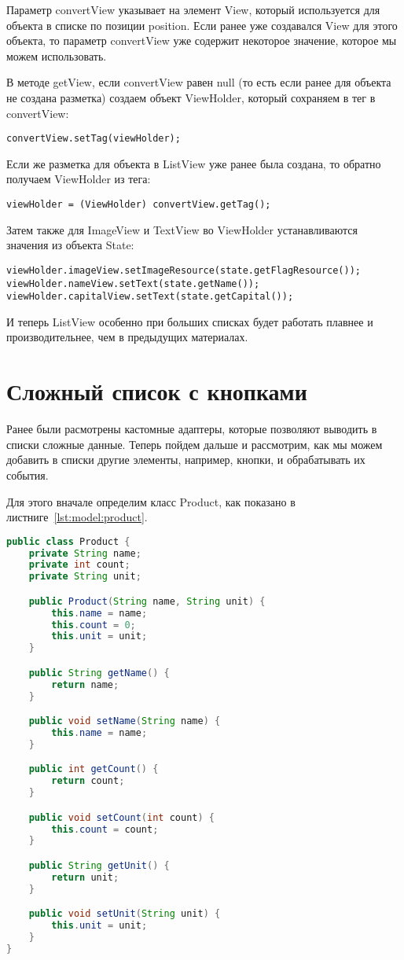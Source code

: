 Параметр convertView указывает на элемент View, который используется для
объекта в списке по позиции position. Если ранее уже создавался View для
этого объекта, то параметр convertView уже содержит некоторое значение,
которое мы можем использовать.\par
В методе getView, если convertView равен null (то есть если ранее для
объекта не создана разметка) создаем объект ViewHolder, который сохраняем
в тег в convertView:

\begin{verbatim}
convertView.setTag(viewHolder);
\end{verbatim}

Если же разметка для объекта в ListView уже ранее была создана, то обратно
получаем ViewHolder из тега:

\begin{verbatim}
viewHolder = (ViewHolder) convertView.getTag();
\end{verbatim}

Затем также для ImageView и TextView во ViewHolder устанавливаются
значения из объекта State:

\begin{verbatim}
viewHolder.imageView.setImageResource(state.getFlagResource());
viewHolder.nameView.setText(state.getName());
viewHolder.capitalView.setText(state.getCapital());
\end{verbatim}

И теперь ListView особенно при больших списках будет работать плавнее и
производительнее, чем в предыдущих материалах.

\section{Сложный список с кнопками}
Ранее были расмотрены кастомные адаптеры, которые позволяют выводить в
списки сложные данные. Теперь пойдем дальше и рассмотрим, как мы можем
добавить в списки другие элементы, например, кнопки, и обрабатывать их
события.\par
Для этого вначале определим класс Product, как показано
в листниге~\ref{lst:model:product}.

\begin{lstlisting}[language=Java
	, label=lst:model:product
	]
public class Product {
	private String name;
	private int count;
	private String unit;

	public Product(String name, String unit) {
		this.name = name;
		this.count = 0;
		this.unit = unit;
	}

	public String getName() {
		return name;
	}

	public void setName(String name) {
		this.name = name;
	}

	public int getCount() {
		return count;
	}

	public void setCount(int count) {
		this.count = count;
	}

	public String getUnit() {
		return unit;
	}

	public void setUnit(String unit) {
		this.unit = unit;
	}
}
\end{lstlisting}

